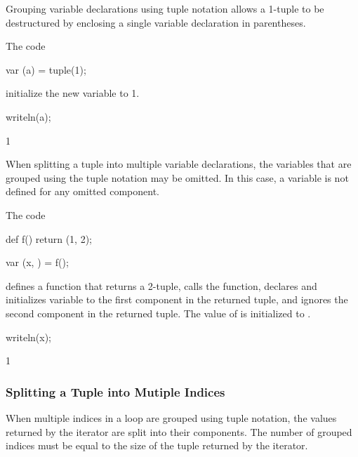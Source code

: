 Grouping variable declarations using tuple notation allows a 1-tuple
to be destructured by enclosing a single variable declaration in
parentheses.
\begin{example}
\begin{chapelpre}
\end{chapelpre}
The code
\begin{chapel}
var (a) = tuple(1);
\end{chapel}
initialize the new variable  to 1.
\begin{chapelpost}
writeln(a);
\end{chapelpost}
\begin{chapeloutput}
1
\end{chapeloutput}
\end{example}

When splitting a tuple into multiple variable declarations, the
variables that are grouped using the tuple notation may be omitted.  In
this case, a variable is not defined for any omitted component.

\begin{example}
\begin{chapelpre}
\end{chapelpre}
The code
\begin{chapel}
def f()
  return (1, 2);

var (x, ) = f();
\end{chapel}
defines a function that returns a 2-tuple, calls the function,
declares and initializes variable  to the first component in
the returned tuple, and ignores the second component in the returned
tuple.  The value of  is initialized to .
\begin{chapelpost}
writeln(x);
\end{chapelpost}
\begin{chapeloutput}
1
\end{chapeloutput}
\end{example}

\subsubsection{Splitting a Tuple into Mutiple Indices}
\label{Indices_in_a_Tuple}

When multiple indices in a loop are grouped using tuple notation, the
values returned by the iterator are split into their components.  The
number of grouped indices must be equal to the size of the tuple
returned by the iterator.

